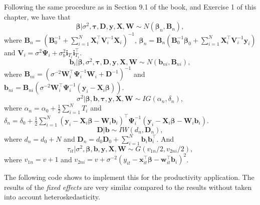 \begin{enumerate}[leftmargin=*]
Following the same procedure as in Section 9.1 of the book, and Exercise 1 of this chapter, we have that
\begin{equation*}
	\bm{\beta}|\sigma^2,\bm{\tau},\bm{D},\bm{y}, \bm{X}, \bm{W} \sim {N}(\bm{\beta}_n,\bm{B}_n), 
\end{equation*}
where $\bm{B}_n = (\bm{B}_0^{-1} +\sum_{i=1}^N \bm{X}_i^{\top}\bm{V}_i^{-1}\bm{X}_i)^{-1}$, $\bm{\beta}_n= \bm{B}_n(\bm{B}_0^{-1}\bm{\beta}_0 + \sum_{i=1}^N\bm{X}_i^{\top}\bm{V}_i^{-1}\bm{y}_i)$ and $\bm{V}_i=\sigma^2\bm{\Psi}_i+\sigma_{b}^2\bm{i}_{T_i}\bm{i}_{T_i}^{\top}$.
\begin{equation*}
	\bm{b}_i|\bm{\beta},\sigma^2,\bm{\tau},\bm{D},\bm{y}, \bm{X}, \bm{W} \sim {N}(\bm{b}_{ni},\bm{B}_{ni}), 
\end{equation*} 
where $\bm{B}_{ni}=(\sigma^{-2}\bm{W}_i^{\top}\bm{\Psi}_i^{-1}\bm{W}_i+\bm{D}^{-1})^{-1}$ and $\bm{b}_{ni}=\bm{B}_{ni}(\sigma^{-2}\bm{W}_i^{\top}\bm{\Psi}_i^{-1}(\bm{y}_i-\bm{X}_i\bm{\beta}))$.
\begin{equation*}
	\sigma^2| \bm{\beta}, \bm{b}, \bm{\tau}, \bm{y}, \bm{X}, \bm{W} \sim {I}{G}(\alpha_n, \delta_n),
\end{equation*}
where $\alpha_n=\alpha_0+\frac{1}{2}\sum_{i=1}^N T_i$ and $\delta_n=\delta_0+\frac{1}{2}\sum_{i=1}^N(\bm{y}_i-\bm{X}_i\bm{\beta}-\bm{W}_i\bm{b}_i)^{\top}\bm{\Psi}_i^{-1}(\bm{y}_i-\bm{X}_i\bm{\beta}-\bm{W}_i\bm{b}_i)$.  
\begin{equation*}
	\bm{D}| \bm{b} \sim {I}{W}(d_n, \bm{D}_n),
\end{equation*}
where $d_n=d_0+N$ and $\bm{D}_n=d_0\bm{D}_0+\sum_{i=1}^N\bm{b}_i\bm{b}_i^{\top}$. And
\begin{equation*}
	\tau_{it}|\sigma^2, \bm{\beta}, \bm{b}, \bm{y}, \bm{X}, \bm{W} \sim {G}(v_{1n}/2, v_{2ni}/2),
\end{equation*}
where $v_{1n}=v+1$ and $v_{2ni}=v+\sigma^{-2}(y_{it}-\bm{x}_{it}^{\top}\bm{\beta}-\bm{w}_{it}^{\top}\bm{b}_i)^2$.

The following code shows to implement this for the productivity application. The results of the \textit{fixed effects} are very similar compared to the results without taken into account heteroskedasticity. 


\end{enumerate}
